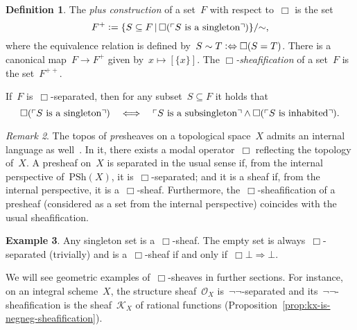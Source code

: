 \documentclass[10pt]{amsart}
\theoremstyle{definition}
\newtheorem{defn}{Definition}[section]
\newtheorem{ex}[defn]{Example}
\theoremstyle{plain}
\theoremstyle{remark}
\newtheorem{rem}[defn]{Remark}
\renewcommand{\O}{\mathcal{O}}
\newcommand{\K}{\mathcal{K}}
\newcommand{\PSh}{\mathrm{PSh}}
\newcommand{\?}{\,{:}\,}
\renewcommand{\_}{\mathpunct{.}\,}
\newcommand{\speak}[1]{\ulcorner\text{\textnormal{#1}}\urcorner}
\newcommand{\defeq}{\vcentcolon=}
\begin{document}
\begin{defn}\label{defn:plus-construction}
The \emph{plus construction} of a set~$F$ with respect to~$\Box$ is the set
\[ F^+ \defeq \{ S \subseteq F \,|\, \Box(\speak{$S$ is a singleton}) \}/{\sim},
\]
where the equivalence relation is defined by~$S \sim T \vcentcolon\Leftrightarrow
\Box(S = T)$. There is a canonical map~$F \to F^+$ given by~$x \mapsto
[\{x\}]$. The \emph{$\Box$-sheafi\-fi\-ca\-tion} of a set~$F$ is the
set~$F^{++}$.
\end{defn}

If~$F$ is~$\Box$-separated, then for any subset~$S \subseteq F$ it holds
that
\[ \Box(\speak{$S$ is a singleton}) \quad\Longleftrightarrow\quad
  \speak{$S$ is a subsingleton} \wedge \Box(\speak{$S$ is inhabited}). \]

\begin{rem}The topos of \emph{pre}sheaves on a topological space~$X$ admits an
internal language as well~\cite[Section~VI.7, discussion after
Theorem~1]{moerdijk-maclane:sheaves-logic}. In it, there
exists a modal operator~$\Box$ reflecting the topology of~$X$. A presheaf on~$X$ is separated
in the usual sense if, from the internal perspective of~$\PSh(X)$, it
is~$\Box$-separated; and it is a sheaf if, from the internal perspective, it
is a~$\Box$-sheaf. Furthermore, the~$\Box$-sheafification of a presheaf
(considered as a set from the internal perspective) coincides with the usual
sheafification.\end{rem}

\begin{ex}\label{ex:special-sets-sheaves}
Any singleton set is a~$\Box$-sheaf. The empty set is
always~$\Box$-separated (trivially) and is a~$\Box$-sheaf if and only
if~$\Box\bot \Rightarrow \bot$.\end{ex}

We will see geometric examples of~$\Box$-sheaves in further sections.
For instance, on an integral scheme~$X$, the structure sheaf~$\O_X$
is~$\neg\neg$-separated and its~$\neg\neg$-sheafification is the sheaf~$\K_X$
of rational functions (Proposition~\ref{prop:kx-is-negneg-sheafification}).
\end{document}
